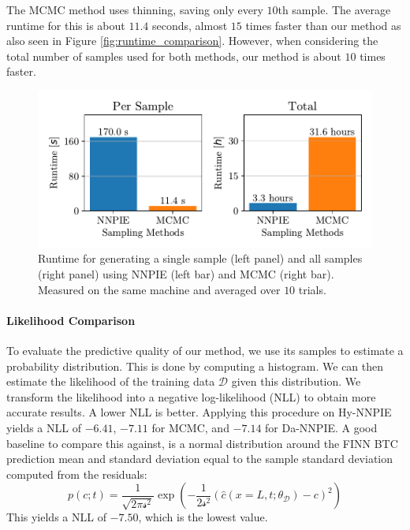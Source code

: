 The MCMC method uses thinning, saving only every $10$th sample. The average runtime for this is about $11.4$ seconds, almost $15$ times faster than our method as also seen in Figure \vref{fig:runtime_comparison}.
However, when considering the total number of samples used for both methods, our method is about $10$ times faster.

\begin{figure}[h]
    \centering
    \includegraphics{figs/runtime_comparison.pdf}
    \caption{Runtime for generating a single sample (left panel) and all samples (right panel) using NNPIE (left bar) and MCMC (right bar). Measured on the same machine and averaged over $10$ trials.}
    \label{fig:runtime_comparison}
\end{figure}



\paragraph{Likelihood Comparison}
\label{sec:likelihood}
To evaluate the predictive quality of our method, we use its samples to estimate a probability distribution. This is done by computing a histogram. We can then estimate the likelihood of the training data $\mathcal{D}$ given this distribution. We transform the likelihood into a negative log-likelihood (NLL) to obtain more accurate results. A lower NLL is better. Applying this procedure on Hy-NNPIE yields a NLL of $-6.41$, $-7.11$ for MCMC, and $-7.14$ for Da-NNPIE. A good baseline to compare this against, is a normal distribution around the FINN BTC prediction mean and standard deviation equal to the sample standard deviation computed from the residuals:
\begin{equation*}
    p(c; t) = \frac{1}{\sqrt{2 \pi \mathcal{s}^2}} \exp(-\frac{1}{2 \mathcal{s}^2} (\hat{c}(x=L, t; \theta_{\mathcal{D}}) - c)^2)
\end{equation*}
This yields a NLL of $-7.50$, which is the lowest value. %



